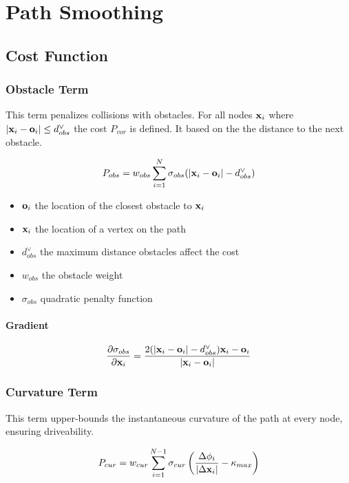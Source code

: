 \chapter{Path Smoothing}

\section{Cost Function}
\subsection{Obstacle Term}

This term penalizes collisions with obstacles. For all nodes $\mathbf{x}_i$ where $|\mathbf{x}_i - \mathbf{o}_i| \leq d_{obs}^{\lor}$ the cost $P_{vor}$ is defined. It based on the the distance to the next obstacle.

\begin{equation}
P_{obs} = w_{obs} \displaystyle\sum_{i=1}^{N} \sigma_{obs}(|\mathbf{x}_i-\mathbf{o}_i|-d_{obs}^{\lor})
\end{equation}

\begin{itemize}
\item $\mathbf{o}_i$ the location of the closest obstacle to $\mathbf{x}_i$
\item $\mathbf{x}_i$ the location of a vertex on the path
\item $d_{obs}^{\lor}$  the maximum distance obstacles affect the cost
\item $w_{obs}$ the obstacle weight
\item $\sigma_{obs}$ quadratic penalty function
\end{itemize}

\subsubsection{Gradient}

\begin{equation}
\frac{\partial \sigma_{obs}}{\partial \mathbf{x}_i} = \frac{2(|\mathbf{x}_i-\mathbf{o}_i|-d_{obs}^{\lor})\mathbf{x}_i-\mathbf{o}_i}{|\mathbf{x}_i-\mathbf{o}_i|}
\end{equation}

\subsection{Curvature Term}
This term upper-bounds the instantaneous curvature of the path at every node, ensuring driveability.

\begin{equation}
P_{cur} = w_{cur} \displaystyle\sum_{i=1}^{N-1} \sigma_{cur}\left(\frac{\Delta\phi_i}{|\Delta\mathbf{x}_i|} - \kappa_{max}\right)
\end{equation}

